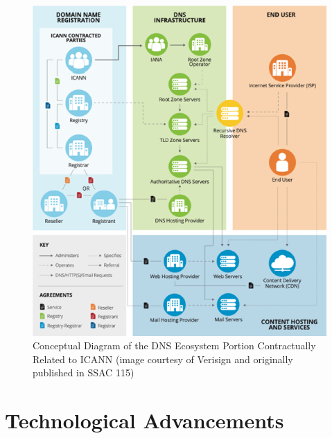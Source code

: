 \clearpage
\captionsetup{font= small}
\begin{figure}[ht!]
    \centering
    \includegraphics[width=1.0\linewidth]{background/DNSECO.png}
    \caption{Conceptual Diagram of the DNS Ecosystem Portion Contractually Related to ICANN (image
courtesy of Verisign and originally published in SSAC 115)}
    \label{fig:fig14}
\end{figure}
\clearpage

\section{Technological Advancements}

